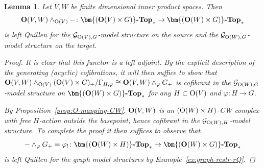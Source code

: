 \documentclass[reqno]{memo-l}
\theoremstyle{mythm}
\newtheorem{lemma}[thm]{Lemma}
\theoremstyle{definition}
\numberwithin{equation}{section}
\renewcommand{\phi}{\varphi}
\newcommand{\cat}[1]{\textbf{\textup{#1}}}
\renewcommand{\O}{{\textup{O}}}
\let\smashp=\wedge
\begin{document}
\begin{lemma}\label{lemma:O-cobc-lQ}
    Let $V,W$ be finite dimensional inner product spaces. Then
    \[
    \cat{O}(V,W)\smashp_{\O(V)}{-}\colon\cat{$\bm{(\O(V)\times G)}$-Top}_*\to \cat{$\bm{(\O(W)\times G)}$-Top}_*
    \]
    is left Quillen for the $\mathcal G_{\O(V),G}$-model structure on the source and the $\mathcal G_{\O(W),G}$-model structure on the target.
    \begin{proof}
        It is clear that this functor is a left adjoint. By the explicit description of the generating (acyclic) cofibrations, it will then suffice to show that ${\cat{O}(V,W)\smashp_{\O(V)}(\O(V)\times G)_+/\Gamma_{H,\phi}}\cong \cat{O}(V,W)\smashp_\phi G_+$ is cofibrant in the $\mathcal G_{\O(W),G}$-model structure on $\cat{$\bm{(\O(W)\times G)}$-Top}_*$ for any $H\subset \O(V)$ and $\phi\colon H\to G$.

        By Proposition~\ref{prop:O-mapping-CW}, $\cat{O}(V,W)$ is an $(\O(W)\times H)$-CW complex with free $H$-action outside the basepoint, hence cofibrant in the $\mathcal G_{\O(W),H}$-model structure. To complete the proof it then suffices to observe that
        \[
            {-}\smashp_\phi G_+=\phi_!\colon\cat{$\bm{(\O(W)\times H)}$-Top}_*\to \cat{$\bm{(\O(W)\times G)}$-Top}_*
        \]
        is left Quillen for the graph model structures by Example~\ref{ex:graph-restr-rQ}.
    \end{proof}
\end{lemma}
\end{document}
